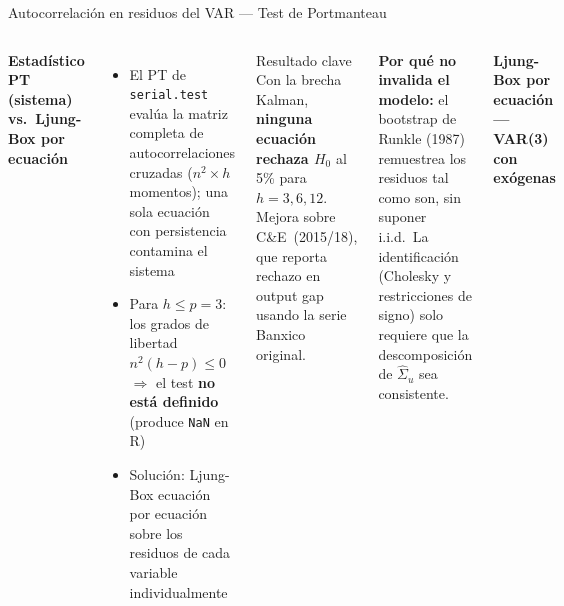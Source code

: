 \documentclass[aspectratio=169, 10pt]{beamer}
\newcommand{\CE}{C\&E~(2015/18)}
\begin{document}
\begin{frame}{Autocorrelación en residuos del VAR — Test de Portmanteau}

  \begin{columns}[T]

    \textbf{\small Estadístico PT (sistema) vs.\ Ljung-Box por ecuación}
    \vspace{3pt}
    \begin{itemize}\setlength\itemsep{4pt}
      \item El PT de \texttt{serial.test} evalúa la matriz completa de
            autocorrelaciones cruzadas ($n^2 \times h$ momentos);
            \alert{una sola ecuación con persistencia contamina el sistema}
      \item Para $h \leq p = 3$: los grados de libertad $n^2(h-p) \leq 0$
            $\Rightarrow$ el test \textbf{no está definido}
            (produce \texttt{NaN} en R)
      \item Solución: \alert{Ljung-Box ecuación por ecuación}
            sobre los residuos de cada variable individualmente
    \end{itemize}

    \vspace{5pt}
    \begin{block}{Resultado clave}
      Con la brecha Kalman, \textbf{ninguna ecuación rechaza $H_0$} al 5\%
      para $h = 3, 6, 12$. Mejora sobre \CE, que reporta rechazo en
      output gap usando la serie Banxico original.
    \end{block}

    \vspace{5pt}
    \footnotesize
    \textbf{Por qué no invalida el modelo:} el bootstrap de Runkle (1987)
    remuestrea los residuos tal como son, sin suponer i.i.d.\ La
    identificación (Cholesky y restricciones de signo) solo requiere
    que la descomposición de $\hat{\Sigma}_u$ sea consistente.

    \textbf{\small Ljung-Box por ecuación — VAR(3) con exógenas}
    \vspace{3pt}


\end{columns}
\end{frame}
\end{document}
